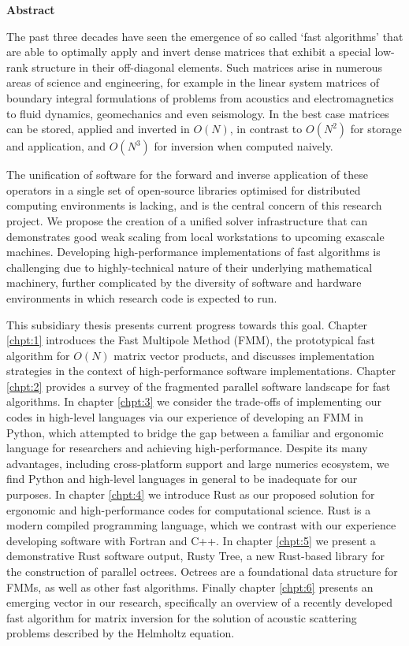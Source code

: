 \thispagestyle{plain}

\begin{center}
    \textbf{Abstract}
\end{center}

The past three decades have seen the emergence of so called `fast algorithms' that are able to optimally apply and invert dense matrices that exhibit a special low-rank structure in their off-diagonal elements. Such matrices arise in numerous areas of science and engineering, for example in the linear system matrices of boundary integral formulations of problems from acoustics and electromagnetics to fluid dynamics, geomechanics and even seismology. In the best case matrices can be stored, applied and inverted in $O(N)$, in contrast to $O(N^2)$ for storage and application, and $O(N^3)$ for inversion when computed naively.

The unification of software for the forward and inverse application of these operators in a single set of open-source libraries optimised for distributed computing environments is lacking, and is the central concern of this research project. We propose the creation of a unified solver infrastructure that can demonstrates good weak scaling from local workstations to upcoming exascale machines. Developing high-performance implementations of fast algorithms is challenging due to highly-technical nature of their underlying mathematical machinery, further complicated by the diversity of software and hardware environments in which research code is expected to run.

This subsidiary thesis presents current progress towards this goal. Chapter \ref{chpt:1} introduces the Fast Multipole Method (FMM), the prototypical fast algorithm for $O(N)$ matrix vector products, and discusses implementation strategies in the context of high-performance software implementations. Chapter \ref{chpt:2} provides a survey of the fragmented parallel software landscape for fast algorithms. In chapter \ref{chpt:3} we consider the trade-offs of implementing our codes in high-level languages via our experience of developing an FMM in Python, which attempted to bridge the gap between a familiar and ergonomic language for researchers and achieving high-performance. Despite its many advantages, including cross-platform support and large numerics ecosystem, we find Python and high-level languages in general to be inadequate for our purposes. In chapter \ref{chpt:4} we introduce Rust as our proposed solution for ergonomic and high-performance codes for computational science. Rust is a modern compiled programming language, which we contrast with our experience developing software with Fortran and C++. In chapter \ref{chpt:5} we present a demonstrative Rust software output, Rusty Tree, a new Rust-based library for the construction of parallel octrees. Octrees are a foundational data structure for FMMs, as well as other fast algorithms. Finally chapter \ref{chpt:6} presents an emerging vector in our research, specifically an overview of a recently developed fast algorithm for matrix inversion for the solution of acoustic scattering problems described by the Helmholtz equation.
